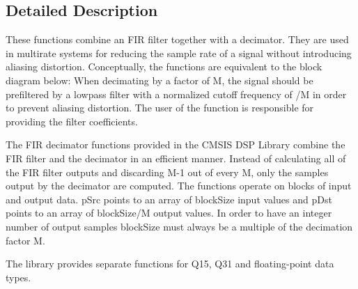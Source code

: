 \subsection{Detailed Description}
These functions combine an F\-I\-R filter together with a decimator. They are used in multirate systems for reducing the sample rate of a signal without introducing aliasing distortion. Conceptually, the functions are equivalent to the block diagram below\-:  When decimating by a factor of {\ttfamily M}, the signal should be prefiltered by a lowpass filter with a normalized cutoff frequency of {/\-M} in order to prevent aliasing distortion. The user of the function is responsible for providing the filter coefficients.

The F\-I\-R decimator functions provided in the C\-M\-S\-I\-S D\-S\-P Library combine the F\-I\-R filter and the decimator in an efficient manner. Instead of calculating all of the F\-I\-R filter outputs and discarding {\ttfamily M-\/1} out of every {\ttfamily M}, only the samples output by the decimator are computed. The functions operate on blocks of input and output data. {\ttfamily p\-Src} points to an array of {\ttfamily block\-Size} input values and {\ttfamily p\-Dst} points to an array of {\ttfamily block\-Size/\-M} output values. In order to have an integer number of output samples {\ttfamily block\-Size} must always be a multiple of the decimation factor {\ttfamily M}.

The library provides separate functions for Q15, Q31 and floating-\/point data types.

